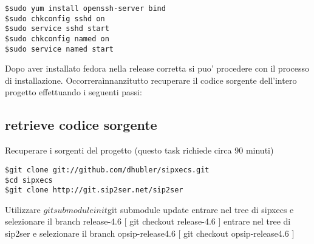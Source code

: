 \begin{verbatim}
$sudo yum install openssh-server bind
$sudo chkconfig sshd on
$sudo service sshd start
$sudo chkconfig named on 
$sudo service named start
\end{verbatim}

Dopo aver installato fedora nella release corretta si puo' procedere con il processo di installazione. Occorrera\` innanzitutto recuperare il codice sorgente dell'intero progetto effettuando i seguenti passi:

\subsection{retrieve codice sorgente}

Recuperare i sorgenti del progetto (questo task richiede circa 90 minuti) 

\begin{verbatim}
$git clone git://github.com/dhubler/sipxecs.git
$cd sipxecs  
$git clone http://git.sip2ser.net/sip2ser
\end{verbatim}

Utilizzare 
$git submodule init 
$git submodule update
entrare nel tree di sipxecs e selezionare il branch release-4.6 [ git checkout release-4.6 ]
entrare nel tree di sip2ser e selezionare il branch opsip-release4.6 [ git checkout opsip-release4.6 ]
